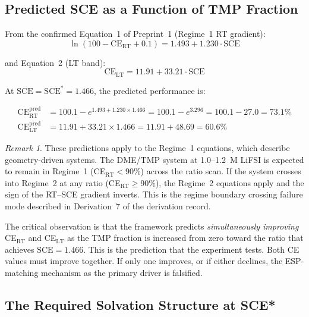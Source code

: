 \documentclass[11pt]{article}
\theoremstyle{plain}
\theoremstyle{definition}
\theoremstyle{remark}
\newtheorem{remark}{Remark}[section]
\begin{document}
\subsection{Predicted SCE as a Function of TMP Fraction}

From the confirmed Equation~1 of Preprint~1 (Regime~1 RT gradient):
\begin{equation}
  \ln(100 - \mathrm{CE}_{\mathrm{RT}} + 0.1) = 1.493 + 1.230 \cdot \mathrm{SCE}
  \label{eq:RT_gradient}
\end{equation}

and Equation~2 (LT band):
\begin{equation}
  \mathrm{CE}_{\mathrm{LT}} = 11.91 + 33.21 \cdot \mathrm{SCE}
  \label{eq:LT_band}
\end{equation}

At $\mathrm{SCE} = \mathrm{SCE}^{*} = 1.466$, the predicted performance is:

\begin{align}
  \mathrm{CE}_{\mathrm{RT}}^{\mathrm{pred}}
  &= 100.1 - e^{1.493 + 1.230 \times 1.466}
   = 100.1 - e^{3.296}
   = 100.1 - 27.0
   = 73.1\%
  \label{eq:CE_RT_pred}\\[6pt]
  \mathrm{CE}_{\mathrm{LT}}^{\mathrm{pred}}
  &= 11.91 + 33.21 \times 1.466
   = 11.91 + 48.69
   = 60.6\%
  \label{eq:CE_LT_pred}
\end{align}

\begin{remark}
These predictions apply to the Regime~1 equations, which describe
geometry-driven systems.  The DME/TMP system at 1.0--1.2~M LiFSI is
expected to remain in Regime~1 (CE$_{\mathrm{RT}} < 90\%$) across the
ratio scan.  If the system crosses into Regime~2 at any ratio
(CE$_{\mathrm{RT}} \geq 90\%$), the Regime~2 equations apply and the
sign of the RT--SCE gradient inverts.  This is the regime boundary
crossing failure mode described in Derivation~7 of the derivation record.
\end{remark}

The critical observation is that the framework predicts
\emph{simultaneously improving} CE$_{\mathrm{RT}}$ and CE$_{\mathrm{LT}}$
as the TMP fraction is increased from zero toward the ratio that achieves
$\mathrm{SCE} = 1.466$.  This is the prediction that the experiment tests.
Both CE values must improve together.  If only one improves, or if either
declines, the ESP-matching mechanism as the primary driver is falsified.

\subsection{The Required Solvation Structure at SCE*}
\end{document}
